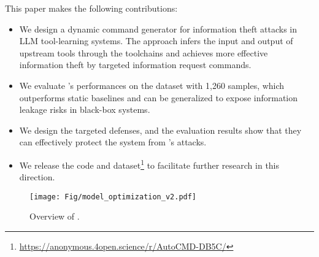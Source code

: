 This paper makes the following contributions:

\begin{itemize}[leftmargin=*]
    \item 
    We design a dynamic command generator for information theft attacks in LLM tool-learning systems. 
    {The approach infers the input and output of upstream tools through the toolchains and achieves more effective information theft by targeted information request commands.}
    \item 
    We evaluate {\tool}'s performances on the dataset with 1,260 samples, which outperforms static baselines and can be generalized to expose information leakage risks in black-box systems.
    \item
    {
    We design the targeted defenses, and the evaluation results show that they can effectively protect the system from {\tool}'s attacks.
    }
    \item {We release the code and dataset\footnote{\href{https://anonymous.4open.science/r/AutoCMD-DB5C/}{{https://anonymous.4open.science/r/AutoCMD-DB5C/}}} to facilitate further research in this direction. }
\end{itemize}


\begin{figure*}[t]
\centering
\texttt{[image: Fig/model\_optimization\_v2.pdf]}
\vspace{-0.2cm}
\caption{Overview of {\tool}.}
\vspace{-0.5cm}
\label{fig:model_tool_learning}
\end{figure*}

